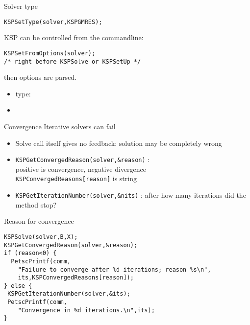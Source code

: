 \begin{numberedframe}{Solver type}

\begin{lstlisting}
KSPSetType(solver,KSPGMRES);
\end{lstlisting}

KSP can be controlled from the commandline:
\begin{lstlisting}
KSPSetFromOptions(solver);
/* right before KSPSolve or KSPSetUp */
\end{lstlisting}
then options  are parsed.
\begin{itemize}
\item type: 
\item {}
\end{itemize}

\end{numberedframe}

\begin{numberedframe}{Convergence}
Iterative solvers can fail
  \begin{itemize}
  \item Solve call itself gives no feedback: solution may be completely wrong
  \item \lstinline{KSPGetConvergedReason(solver,&reason)} : \\
    positive is convergence, negative divergence \\
    \lstinline{KSPConvergedReasons[reason]} is string      
  \item \lstinline{KSPGetIterationNumber(solver,&nits)} : after how many
    iterations did the method stop?
  \end{itemize}
\end{numberedframe}

\begin{numberedframe}{Reason for convergence}
\begin{lstlisting}
KSPSolve(solver,B,X);
KSPGetConvergedReason(solver,&reason);
if (reason<0) {
  PetscPrintf(comm,
    "Failure to converge after %d iterations; reason %s\n",
    its,KSPConvergedReasons[reason]);
} else {
 KSPGetIterationNumber(solver,&its);
 PetscPrintf(comm,
    "Convergence in %d iterations.\n",its);
}
\end{lstlisting}
\end{numberedframe}

